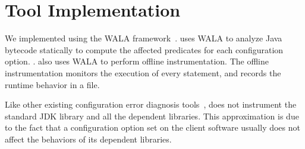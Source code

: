 \section{Tool Implementation}
\label{sec:implementation}

We implemented \ourtool using the WALA
framework~\cite{}. \ourtool uses WALA
to analyze Java bytecode statically to
compute the affected predicates for each
configuration option. .
\ourtool also uses WALA to perform offline
instrumentation. The offline instrumentation
monitors the execution of every statement,
and records the runtime behavior in a file.

Like other existing configuration error
diagnosis tools~\cite{}, \ourtool does not 
instrument the standard JDK library and
all the dependent libraries. This approximation
is due to the fact that a configuration
option set on the client software usually
does not affect the behaviors of its dependent libraries.

